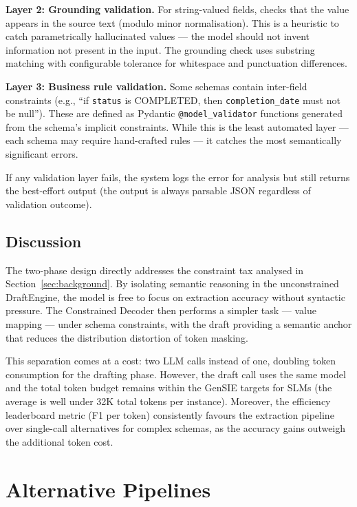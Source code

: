 \documentclass{ceurart}
\begin{document}
\textbf{Layer 2: Grounding validation.}
For string-valued fields, checks that the value appears in the source text (modulo
minor normalisation).
This is a heuristic to catch parametrically hallucinated values --- the model should
not invent information not present in the input.
The grounding check uses substring matching with configurable tolerance for whitespace
and punctuation differences.

\textbf{Layer 3: Business rule validation.}
Some schemas contain inter-field constraints (e.g., ``if \texttt{status} is COMPLETED,
then \texttt{completion\_date} must not be null'').
These are defined as Pydantic \texttt{@model\_validator} functions generated from the
schema's implicit constraints.
While this is the least automated layer --- each schema may require hand-crafted rules
--- it catches the most semantically significant errors.

If any validation layer fails, the system logs the error for analysis but still returns
the best-effort output (the output is always parsable JSON regardless of validation
outcome).

\subsection{Discussion}

The two-phase design directly addresses the constraint tax analysed in
Section~\ref{sec:background}.
By isolating semantic reasoning in the unconstrained DraftEngine, the model is free to
focus on extraction accuracy without syntactic pressure.
The Constrained Decoder then performs a simpler task --- value mapping --- under schema
constraints, with the draft providing a semantic anchor that reduces the distribution
distortion of token masking.

This separation comes at a cost: two LLM calls instead of one, doubling token
consumption for the drafting phase.
However, the draft call uses the same model and the total token budget remains within
the GenSIE targets for SLMs (the average is well under 32K total tokens per instance).
Moreover, the efficiency leaderboard metric (F1 per token) consistently favours the
extraction pipeline over single-call alternatives for complex schemas, as the accuracy
gains outweigh the additional token cost.

\section{Alternative Pipelines}
\label{sec:alternatives}
\end{document}
